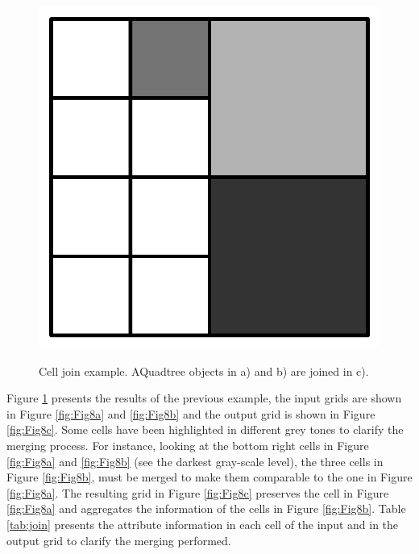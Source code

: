 \begin{figure}[hb!]
\begin{minipage}[b]{0.2\linewidth}
    \subcaption{}
    \label{fig:Fig8b}
  \end{minipage}
  \begin{minipage}[b]{0.2\linewidth}
    \includegraphics[width=\linewidth]{images/Fig8c}
    \subcaption{}
    \label{fig:Fig8c}
  \end{minipage}
  \caption{Cell join example. AQuadtree objects in a) and b) are joined in c).}
  \label{fig:Fig8}
\end{figure}

Figure \ref{fig:Fig8} presents the results of the previous example, the input grids are shown in Figure \ref{fig:Fig8a} and \ref{fig:Fig8b} and the output grid is shown in Figure \ref{fig:Fig8c}. Some cells have been highlighted in different grey tones to clarify the merging process. For instance, looking at the bottom right cells in Figure \ref{fig:Fig8a} and \ref{fig:Fig8b} (see the darkest gray-scale level), the three cells in Figure \ref{fig:Fig8b}, must be merged to make them comparable to the one in Figure \ref{fig:Fig8a}. The resulting grid in Figure \ref{fig:Fig8c} preserves the cell in Figure \ref{fig:Fig8a} and aggregates the information of the cells in Figure \ref{fig:Fig8b}. Table \ref{tab:join} presents the attribute information in each cell of the input and in the output grid to clarify the merging performed. 

